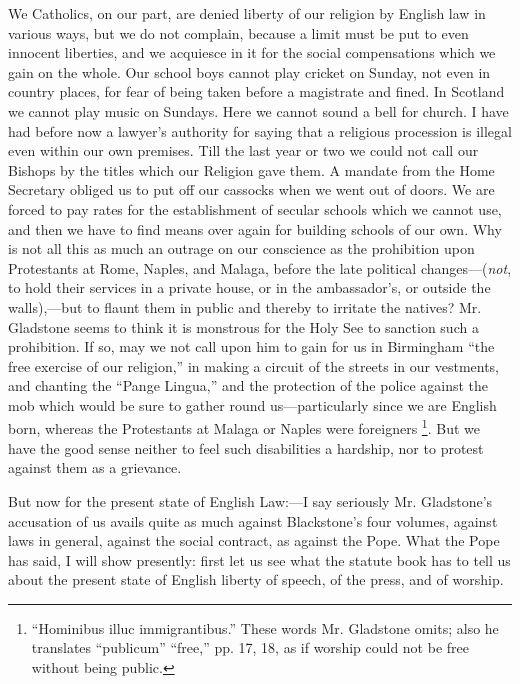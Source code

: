 We Catholics, on our part, are denied liberty of our religion by
English law in various ways, but we do not complain, because a limit
must be put to even innocent liberties, and we acquiesce in it for the
social compensations which we gain on the whole. Our school boys cannot
play cricket on Sunday, not even in country places, for fear of being
taken before a magistrate and fined. In Scotland we cannot play music on
Sundays. Here we cannot sound a bell for church. I have had before now a
lawyer's authority for saying that a religious procession is illegal
even within our own premises. Till the last year or two we could not
call our Bishops by the titles which our Religion gave them. A mandate
from the Home Secretary obliged us to put off our cassocks when we went
out of doors. We are forced to pay rates for the establishment of
secular schools which we cannot use, and then we have to find means over
again for building schools of our own. Why is not all this as much an outrage on our conscience as the prohibition upon Protestants at
Rome, Naples, and Malaga, before the late political changes—(\emph{not},
to hold their services in a private house, or in the ambassador's, or
outside the walls),—but to flaunt them in public and thereby to
irritate the natives? Mr. Gladstone seems to think it is monstrous for
the Holy See to sanction such a prohibition. If so, may we not call upon
him to gain for us in Birmingham ``the free exercise of our
religion,'' in making a circuit of the streets in our vestments, and
chanting the ``Pange Lingua,'' and the protection of the police
against the mob which would be sure to gather round us—particularly
since we are English born, whereas the Protestants at Malaga or Naples
were foreigners \footnote{``Hominibus illuc immigrantibus.'' These words Mr.
Gladstone omits; also he translates ``publicum''
``free,'' pp. 17, 18, as if worship could not be free without
being public.}. But we
have the good sense neither to feel such disabilities a hardship, nor to
protest against them as a grievance.

But now for the present state of English Law:—I say seriously Mr.
Gladstone's accusation of us avails quite as much against Blackstone's
four volumes, against laws in general, against the social contract, as
against the Pope. What the Pope has said, I will show presently: first
let us see what the statute book has to tell us about the present state
of English liberty of speech, of the press, and of worship.


